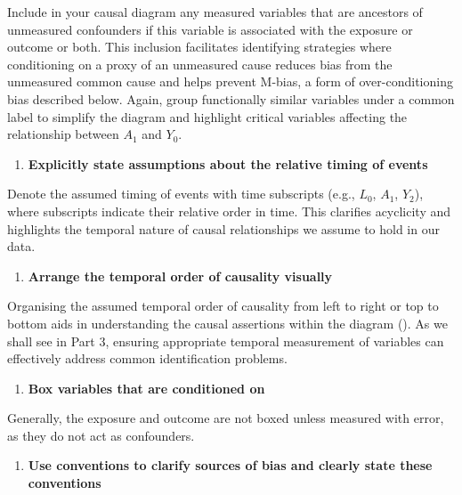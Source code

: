 \documentclass[
  singlecolumn]{article}
\providecommand{\tightlist}{%
  \setlength{\itemsep}{0pt}\setlength{\parskip}{0pt}}\usepackage{longtable,booktabs,array}
\begin{document}
Include in your causal diagram any measured variables that are ancestors
of unmeasured confounders if this variable is associated with the
exposure or outcome or both. This inclusion facilitates identifying
strategies where conditioning on a proxy of an unmeasured cause reduces
bias from the unmeasured common cause and helps prevent M-bias, a form
of over-conditioning bias described below. Again, group functionally
similar variables under a common label to simplify the diagram and
highlight critical variables affecting the relationship between \(A_1\)
and \(Y_0\).

\begin{enumerate}
\def\labelenumi{\arabic{enumi}.}
\setcounter{enumi}{2}
\tightlist
\item
  \textbf{Explicitly state assumptions about the relative timing of
  events}
\end{enumerate}

Denote the assumed timing of events with time subscripts (e.g., \(L_0\),
\(A_1\), \(Y_2\)), where subscripts indicate their relative order in
time. This clarifies acyclicity and highlights the temporal nature of
causal relationships we assume to hold in our data.

\begin{enumerate}
\def\labelenumi{\arabic{enumi}.}
\setcounter{enumi}{3}
\tightlist
\item
  \textbf{Arrange the temporal order of causality visually}
\end{enumerate}

Organising the assumed temporal order of causality from left to right or
top to bottom aids in understanding the causal assertions within the
diagram (). As we shall see in
Part 3, ensuring appropriate temporal measurement of variables can
effectively address common identification problems.

\begin{enumerate}
\def\labelenumi{\arabic{enumi}.}
\setcounter{enumi}{4}
\tightlist
\item
  \textbf{Box variables that are conditioned on}
\end{enumerate}

Generally, the exposure and outcome are not boxed unless measured with
error, as they do not act as confounders.

\begin{enumerate}
\def\labelenumi{\arabic{enumi}.}
\setcounter{enumi}{5}
\tightlist
\item
  \textbf{Use conventions to clarify sources of bias and clearly state
  these conventions}
\end{enumerate}
\end{document}
